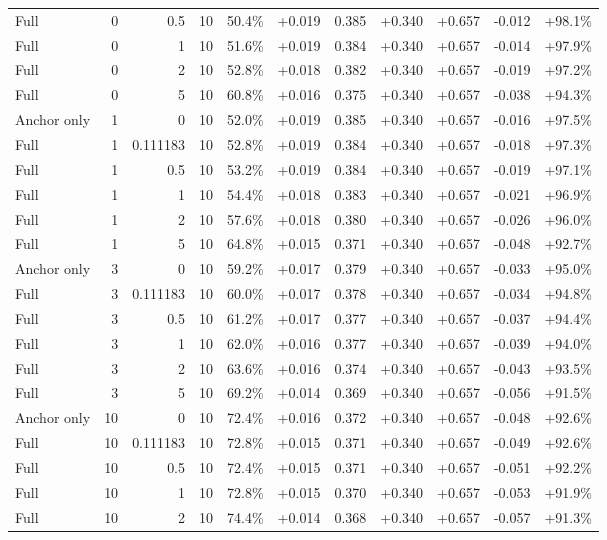 \begin{table}[htbp]
\begin{tabular}{lrrrccccccc}
Full & 0 & 0.5 & 10 & 50.4\% & +0.019 & 0.385 & +0.340 & +0.657 & -0.012 & +98.1\% \\
Full & 0 & 1 & 10 & 51.6\% & +0.019 & 0.384 & +0.340 & +0.657 & -0.014 & +97.9\% \\
Full & 0 & 2 & 10 & 52.8\% & +0.018 & 0.382 & +0.340 & +0.657 & -0.019 & +97.2\% \\
Full & 0 & 5 & 10 & 60.8\% & +0.016 & 0.375 & +0.340 & +0.657 & -0.038 & +94.3\% \\
Anchor only & 1 & 0 & 10 & 52.0\% & +0.019 & 0.385 & +0.340 & +0.657 & -0.016 & +97.5\% \\
Full & 1 & 0.111183 & 10 & 52.8\% & +0.019 & 0.384 & +0.340 & +0.657 & -0.018 & +97.3\% \\
Full & 1 & 0.5 & 10 & 53.2\% & +0.019 & 0.384 & +0.340 & +0.657 & -0.019 & +97.1\% \\
Full & 1 & 1 & 10 & 54.4\% & +0.018 & 0.383 & +0.340 & +0.657 & -0.021 & +96.9\% \\
Full & 1 & 2 & 10 & 57.6\% & +0.018 & 0.380 & +0.340 & +0.657 & -0.026 & +96.0\% \\
Full & 1 & 5 & 10 & 64.8\% & +0.015 & 0.371 & +0.340 & +0.657 & -0.048 & +92.7\% \\
Anchor only & 3 & 0 & 10 & 59.2\% & +0.017 & 0.379 & +0.340 & +0.657 & -0.033 & +95.0\% \\
Full & 3 & 0.111183 & 10 & 60.0\% & +0.017 & 0.378 & +0.340 & +0.657 & -0.034 & +94.8\% \\
Full & 3 & 0.5 & 10 & 61.2\% & +0.017 & 0.377 & +0.340 & +0.657 & -0.037 & +94.4\% \\
Full & 3 & 1 & 10 & 62.0\% & +0.016 & 0.377 & +0.340 & +0.657 & -0.039 & +94.0\% \\
Full & 3 & 2 & 10 & 63.6\% & +0.016 & 0.374 & +0.340 & +0.657 & -0.043 & +93.5\% \\
Full & 3 & 5 & 10 & 69.2\% & +0.014 & 0.369 & +0.340 & +0.657 & -0.056 & +91.5\% \\
Anchor only & 10 & 0 & 10 & 72.4\% & +0.016 & 0.372 & +0.340 & +0.657 & -0.048 & +92.6\% \\
Full & 10 & 0.111183 & 10 & 72.8\% & +0.015 & 0.371 & +0.340 & +0.657 & -0.049 & +92.6\% \\
Full & 10 & 0.5 & 10 & 72.4\% & +0.015 & 0.371 & +0.340 & +0.657 & -0.051 & +92.2\% \\
Full & 10 & 1 & 10 & 72.8\% & +0.015 & 0.370 & +0.340 & +0.657 & -0.053 & +91.9\% \\
Full & 10 & 2 & 10 & 74.4\% & +0.014 & 0.368 & +0.340 & +0.657 & -0.057 & +91.3\% \\

\end{tabular}
\end{table}
